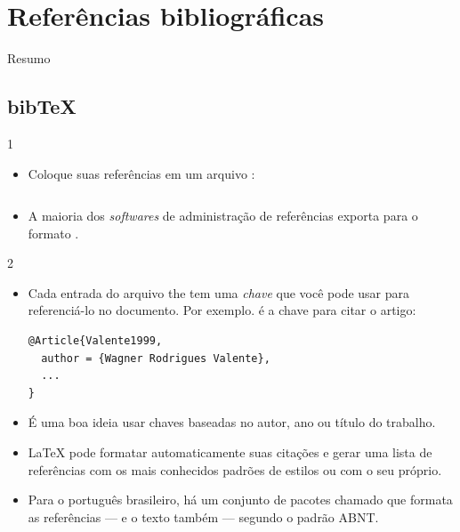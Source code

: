 \documentclass{beamer}
\begin{document}
\section{Referências bibliográficas}

\begin{frame}{Resumo}
\begin{multicols}{2}
\tableofcontents[currentsection]
\end{multicols}
\end{frame}

\subsection{bib\TeX}
\begin{frame}[fragile]{\insertsubsection{} 1}
\begin{itemize}
\item Coloque suas referências em um arquivo  :
\inputminted[fontsize=\tiny,frame=single]{latex}{bib-example.bib}
\item A maioria dos \emph{softwares} de administração de referências exporta para o formato .
\end{itemize}
\end{frame}

\begin{frame}[fragile]{\insertsubsection{} 2}
\begin{itemize}
\item Cada entrada do arquivo the  tem uma \emph{chave} que você pode
usar para referenciá-lo no documento. Por exemplo.   é
a chave para citar o artigo:
\begin{verbatim}
@Article{Valente1999,
  author = {Wagner Rodrigues Valente},
  ...
}
\end{verbatim}
\item É uma boa ideia usar chaves baseadas no autor, ano ou título do trabalho.
\item \LaTeX{} pode formatar automaticamente suas citações e gerar uma lista de
referências com os mais conhecidos padrões de estilos ou com o seu próprio.
\item Para o português brasileiro, há um conjunto de pacotes chamado
\href{http://www.abntex.net.br/}{} que
formata as referências --- e o texto também --- segundo o padrão ABNT.
\end{itemize}
\end{frame}
\end{document}
